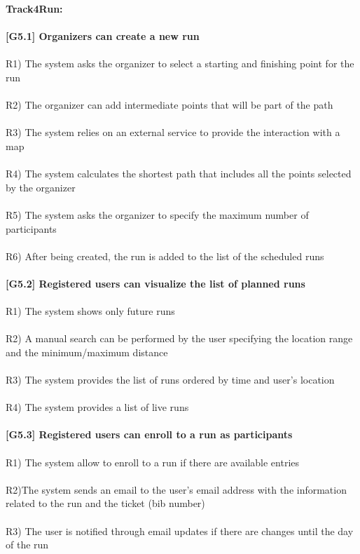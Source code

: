 \textbf{Track4Run:}\\ \\
\textbf{[G5.1] Organizers can create a new run} \\ \\
R1) The system asks the organizer to select a starting and finishing point for the run \\ \\
R2) The organizer can add intermediate points that will be part of the path \\ \\
R3) The system relies on an external service to provide the interaction with a map \\ \\
R4) The system calculates the shortest path that includes all the points selected by the organizer \\ \\   
R5) The system asks the organizer to specify the maximum number of participants \\ \\
R6) After being created, the run is added to the list of the scheduled runs \\ \\
\textbf{[G5.2] Registered users can visualize the list of planned runs} \\ \\
R1) The system shows only future runs \\ \\ 
R2) A manual search can be performed by the user specifying the location range and the minimum/maximum distance \\ \\ 
R3) The system provides the list of runs ordered by time and user’s location \\ \\
R4) The system provides a list of live runs \\ \\
\textbf{[G5.3] Registered users can enroll to a run as participants} \\ \\
R1) The system allow to enroll to a run if there are available entries \\ \\
R2)The system sends an email to the user’s email address with the information related to the run and the ticket (bib number) \\ \\
R3) The user is notified through email updates if there are changes until the day of the run \\ \\
